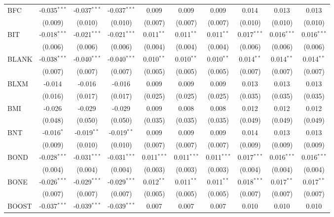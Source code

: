 \begin{table}[!htbp]
\begin{tabular}{@{\extracolsep{5pt}}lccccccccc}
 BFC & -0.035$^{***}$ & -0.037$^{***}$ & -0.037$^{***}$ & 0.009$^{}$ & 0.009$^{}$ & 0.009$^{}$ & 0.014$^{}$ & 0.013$^{}$ & 0.013$^{}$ \\
  & (0.009) & (0.010) & (0.010) & (0.007) & (0.007) & (0.007) & (0.010) & (0.010) & (0.010) \\
 BIT & -0.018$^{***}$ & -0.021$^{***}$ & -0.021$^{***}$ & 0.011$^{**}$ & 0.011$^{**}$ & 0.011$^{**}$ & 0.017$^{***}$ & 0.016$^{***}$ & 0.016$^{***}$ \\
  & (0.006) & (0.006) & (0.006) & (0.004) & (0.004) & (0.004) & (0.006) & (0.006) & (0.006) \\
 BLANK & -0.038$^{***}$ & -0.040$^{***}$ & -0.040$^{***}$ & 0.010$^{**}$ & 0.010$^{**}$ & 0.010$^{**}$ & 0.014$^{**}$ & 0.014$^{**}$ & 0.014$^{**}$ \\
  & (0.007) & (0.007) & (0.007) & (0.005) & (0.005) & (0.005) & (0.007) & (0.007) & (0.007) \\
 BLXM & -0.014$^{}$ & -0.016$^{}$ & -0.016$^{}$ & 0.009$^{}$ & 0.009$^{}$ & 0.009$^{}$ & 0.013$^{}$ & 0.013$^{}$ & 0.013$^{}$ \\
  & (0.016) & (0.017) & (0.017) & (0.025) & (0.025) & (0.025) & (0.035) & (0.035) & (0.035) \\
 BMI & -0.026$^{}$ & -0.029$^{}$ & -0.029$^{}$ & 0.009$^{}$ & 0.008$^{}$ & 0.008$^{}$ & 0.012$^{}$ & 0.012$^{}$ & 0.012$^{}$ \\
  & (0.048) & (0.050) & (0.050) & (0.035) & (0.035) & (0.035) & (0.049) & (0.049) & (0.049) \\
 BNT & -0.016$^{*}$ & -0.019$^{**}$ & -0.019$^{**}$ & 0.009$^{}$ & 0.009$^{}$ & 0.009$^{}$ & 0.014$^{}$ & 0.013$^{}$ & 0.013$^{}$ \\
  & (0.009) & (0.010) & (0.010) & (0.007) & (0.007) & (0.007) & (0.009) & (0.009) & (0.009) \\
 BOND & -0.028$^{***}$ & -0.031$^{***}$ & -0.031$^{***}$ & 0.011$^{***}$ & 0.011$^{***}$ & 0.011$^{***}$ & 0.017$^{***}$ & 0.016$^{***}$ & 0.016$^{***}$ \\
  & (0.004) & (0.004) & (0.004) & (0.003) & (0.003) & (0.003) & (0.004) & (0.004) & (0.004) \\
 BONE & -0.026$^{***}$ & -0.029$^{***}$ & -0.029$^{***}$ & 0.012$^{**}$ & 0.011$^{**}$ & 0.011$^{**}$ & 0.018$^{***}$ & 0.017$^{**}$ & 0.017$^{**}$ \\
  & (0.007) & (0.007) & (0.007) & (0.005) & (0.005) & (0.005) & (0.007) & (0.007) & (0.007) \\
 BOOST & -0.037$^{***}$ & -0.039$^{***}$ & -0.039$^{***}$ & 0.007$^{}$ & 0.007$^{}$ & 0.007$^{}$ & 0.010$^{}$ & 0.010$^{}$ & 0.010$^{}$ \\

\end{tabular}
\end{table}
